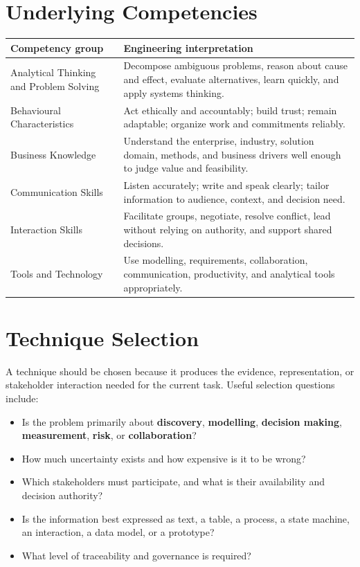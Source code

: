 \documentclass[11pt]{article}
\begin{document}
\section{Underlying Competencies}
\begin{longtable}{L{0.24\textwidth} L{0.64\textwidth}}
\toprule
\textbf{Competency group} & \textbf{Engineering interpretation}\\
\midrule
Analytical Thinking and Problem Solving & Decompose ambiguous problems, reason about cause and effect, evaluate alternatives, learn quickly, and apply systems thinking.\\
Behavioural Characteristics & Act ethically and accountably; build trust; remain adaptable; organize work and commitments reliably.\\
Business Knowledge & Understand the enterprise, industry, solution domain, methods, and business drivers well enough to judge value and feasibility.\\
Communication Skills & Listen accurately; write and speak clearly; tailor information to audience, context, and decision need.\\
Interaction Skills & Facilitate groups, negotiate, resolve conflict, lead without relying on authority, and support shared decisions.\\
Tools and Technology & Use modelling, requirements, collaboration, communication, productivity, and analytical tools appropriately.\\
\bottomrule
\end{longtable}
\section{Technique Selection}
A technique should be chosen because it produces the evidence, representation, or stakeholder interaction needed for the current task. Useful selection questions include:
\begin{itemize}
\item Is the problem primarily about \textbf{discovery}, \textbf{modelling}, \textbf{decision making}, \textbf{measurement}, \textbf{risk}, or \textbf{collaboration}?
\item How much uncertainty exists and how expensive is it to be wrong?
\item Which stakeholders must participate, and what is their availability and decision authority?
\item Is the information best expressed as text, a table, a process, a state machine, an interaction, a data model, or a prototype?
\item What level of traceability and governance is required?
\end{itemize}
\end{document}
